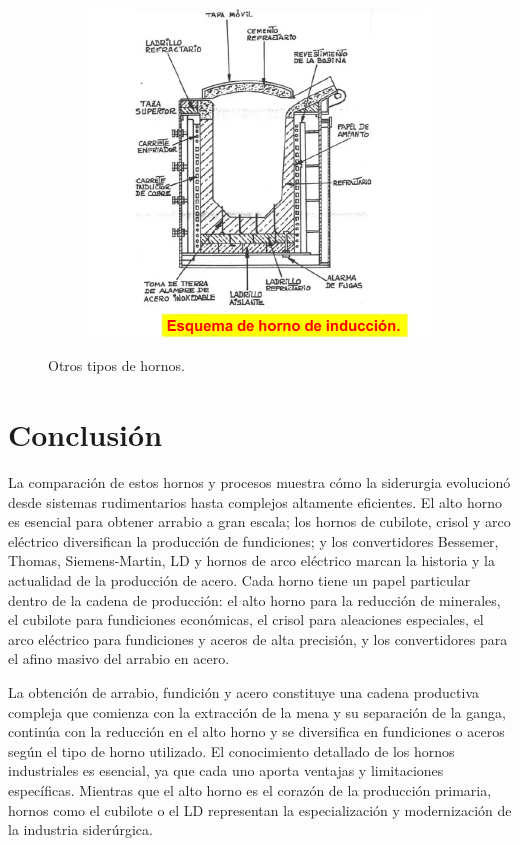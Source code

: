 \documentclass[12pt,a4paper]{article}
\begin{document}
\begin{figure}[h!]
\begin{subfigure}{0.45\textwidth}
        \includegraphics[width=\textwidth]{Inagenes para latex/induccion 2.png}
        \label{induccion}
    \end{subfigure}
    \caption{Otros tipos de hornos.}
    \label{fig:otros_hornos}
 \end{figure}

\section{Conclusión}
La comparación de estos hornos y procesos muestra cómo la siderurgia evolucionó desde sistemas rudimentarios hasta complejos altamente eficientes. El alto horno es esencial para obtener arrabio a gran escala; los hornos de cubilote, crisol y arco eléctrico diversifican la producción de fundiciones; y los convertidores Bessemer, Thomas, Siemens-Martin, LD y hornos de arco eléctrico marcan la historia y la actualidad de la producción de acero. Cada horno tiene un papel particular dentro de la cadena de producción: el alto horno para la reducción de minerales, el cubilote para fundiciones económicas, el crisol para aleaciones especiales, el arco eléctrico para fundiciones y aceros de alta precisión, y los convertidores para el afino masivo del arrabio en acero.

La obtención de arrabio, fundición y acero constituye una cadena productiva compleja que comienza con la extracción de la mena y su separación de la ganga, continúa con la reducción en el alto horno y se diversifica en fundiciones o aceros según el tipo de horno utilizado. El conocimiento detallado de los hornos industriales es esencial, ya que cada uno aporta ventajas y limitaciones específicas. Mientras que el alto horno es el corazón de la producción primaria, hornos como el cubilote o el LD representan la especialización y modernización de la industria siderúrgica.
\end{document}
